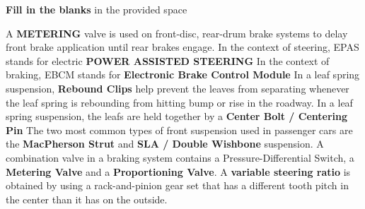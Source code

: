 \documentclass[12pt]{exam}
\begin{document}
        \begin{center}

            \textbf{Fill in the blanks} in the provided space
        \end{center}
        \begin{questions}
        
		
		
        \question A \textbf{METERING} valve is used on front-disc, rear-drum brake systems to delay front brake application until rear brakes engage. %
        \question In the context of steering, EPAS stands for electric \textbf{POWER ASSISTED STEERING}
        \question In the context of braking, EBCM stands for\textbf{ Electronic Brake Control Module}
        \question In a leaf spring suspension, \textbf{Rebound Clips} help prevent the leaves from separating whenever the leaf spring is rebounding from hitting bump or rise in the roadway.
        \question In a leaf spring suspension, the leafs are held together by a \textbf{Center Bolt / Centering Pin}
        \question The two most common types of front suspension used in passenger cars are the \textbf{MacPherson Strut} and \textbf{SLA / Double Wishbone} suspension.
        \question A combination valve in a braking system contains a Pressure-Differential Switch, a \textbf{Metering Valve} and a \textbf{Proportioning Valve}.
        \question A \textbf{variable steering ratio }is obtained by using a rack-and-pinion gear set that has a different tooth pitch in the center than it has on the outside.
        \end{questions}
        \setcounter{question}{0}
\end{document}
